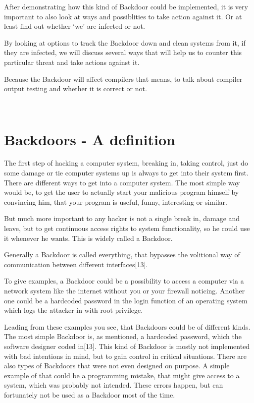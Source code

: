 \documentclass[a4paper, 12pt]{article}
\begin{document}
After demonstrating how this kind of Backdoor could be implemented, it is very important to also look at ways and possiblities to take action against it. Or at least find out whether `we' are infected or not.

By looking at options to track the Backdoor down and clean systems from it, if they are infected, we will discuss several ways that will help us to counter this particular threat and take actions against it.

Because the Backdoor will affect compilers that means, to talk about compiler output testing and whether it is correct or not.

\newpage

\
\section{Backdoors - A definition}

The first step of hacking a computer system, breaking in, taking control, just do some damage or tie computer systems up is always to get into their system first.
There are different ways to get into a computer system. The most simple way would be, to get the user to actually start your malicious program himself by convincing him, that your program is useful, funny, interesting or similar.

But much more important to any hacker is not a single break in, damage and leave, but to get continuous access rights to system functionality, so he could use it whenever he wants. This is widely called a Backdoor.

Generally a Backdoor is called everything, that bypasses the volitional way of communication between different interfaces[13].

To give examples, a Backdoor could be a possibility to access a computer via a network system like the internet without you or your firewall noticing. Another one could be a hardcoded password in the login function of an operating system which logs the attacker in with root privilege.

Leading from these examples you see, that Backdoors could be of different kinds. The most simple Backdoor is, as mentioned, a hardcoded password, which the software designer coded in[13]. This kind of Backdoor is mostly not implemented with bad intentions in mind, but to gain control in critical situations. There are also types of Backdoors that were not even designed on purpose. A simple example of that could be a programming mistake, that might give access to a system, which was probably not intended. These errors happen, but can fortunately not be used as a Backdoor most of the time.
\end{document}
